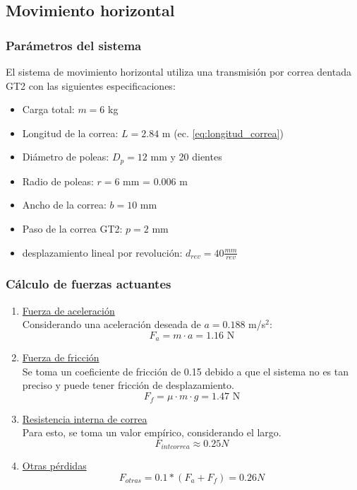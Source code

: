 \subsection{Movimiento horizontal}

\subsubsection{Parámetros del sistema}

El sistema de movimiento horizontal utiliza una transmisión por correa dentada GT2 con las siguientes especificaciones:

\begin{itemize}[label=$\bullet$]
    \item Carga total: $m = 6$ kg
    \item Longitud de la correa: $L = 2.84$ m (ec. \ref{eq:longitud_correa})
    \item Diámetro de poleas: $D_p = 12$ mm y 20 dientes
    \item Radio de poleas: $r = 6$ mm = $0.006$ m
    \item Ancho de la correa: $b = 10$ mm
    \item Paso de la correa GT2: $p = 2$ mm
    \item desplazamiento lineal por revolución: $d_{rev} = 40 \frac{mm}{rev}$
\end{itemize}

\subsubsection{Cálculo de fuerzas actuantes}
\begin{enumerate}
    \item \underline{Fuerza de aceleración}\\
        Considerando una aceleración deseada de $a = 0.188$ m/s$^2$:
        \begin{equation}
        F_a = m \cdot a = 1.16\text{ N}
        \end{equation}
    \item \underline{Fuerza de fricción}\\
        Se toma un coeficiente de fricción de 0.15 debido a que el sistema no es tan preciso y puede tener fricción de desplazamiento.
        \begin{equation}
            F_f = \mu \cdot m \cdot g = 1.47 \text{ N}
        \end{equation}
    \item \underline{Resistencia interna de correa}\\
        Para esto, se toma un valor empírico, considerando el largo.
        \begin{equation}
        F_{intcorrea} \approx 0.25N
        \end{equation}
    \item \underline{Otras pérdidas}\\
        \begin{equation}
            F_{otras}= 0.1*(F_a+F_f)=0.26N
        \end{equation}
\end{enumerate}

